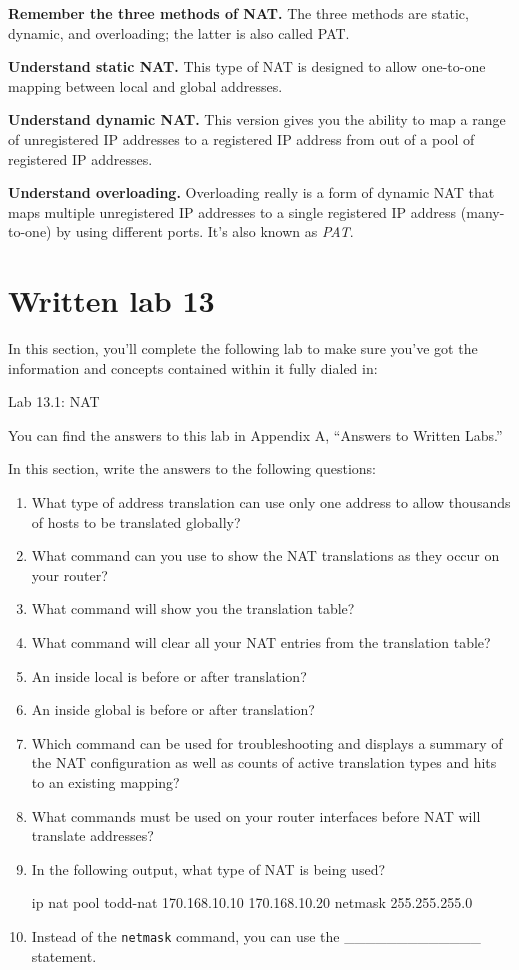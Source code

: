 \textbf{Remember the three methods of NAT.} The three methods are
static, dynamic, and overloading; the latter is also called PAT.

\textbf{Understand static NAT.} This type of NAT is designed to allow
one-to-one mapping between local and global addresses.

\textbf{Understand dynamic NAT.} This version gives you the ability to
map a range of unregistered IP addresses to a registered IP address from
out of a pool of registered IP addresses.

\textbf{Understand overloading.} Overloading really is a form of dynamic
NAT that maps multiple unregistered IP addresses to a single registered
IP address (many-to-one) by using different ports. It's also known as
\emph{PAT}.



\section{Written lab 13}

In this section, you'll complete the following lab to make sure you've
got the information and concepts contained within it fully dialed in:

Lab 13.1: NAT

You can find the answers to this lab in Appendix A, ``Answers to Written
Labs.''

In this section,
write the answers to the following questions:

\begin{enumerate}
\item
  What type of address translation can use only one address to allow
  thousands of hosts to be translated globally?
\item
  What command can you use to show the NAT translations as they occur on
  your router?
\item
  What command will show you the translation table?
\item
  What command will clear all your NAT entries from the translation
  table?
\item
  An inside local is before or after translation?
\item
  An inside global is before or after translation?
\item
  Which command can be used for troubleshooting and displays a summary
  of the NAT configuration as well as counts of active translation types
  and hits to an existing mapping?
\item
  What commands must be used on your router interfaces before NAT will
  translate addresses?
\item
  In the following output, what type of NAT is being used?

\begin{cli}
ip nat pool todd-nat 170.168.10.10 170.168.10.20 netmask 255.255.255.0
\end{cli}
\item
  Instead of the \texttt{netmask} command, you can use the
  \_\_\_\_\_\_\_\_\_\_\_\_\_ statement.
\end{enumerate}




